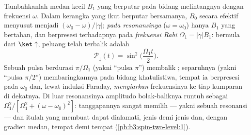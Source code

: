 \begin{proposition}\label{prop:b3:spin-two-level:rabi}
Tambahkanlah medan kecil $B_1$ yang berputar pada bidang melintangnya
dengan frekuensi $\omega$. Dalam kerangka yang ikut berputar
bersamanya, $B_0$ secara efektif menyusut menjadi
$(\omega_0 - \omega)/|\gamma|$; \emph{pada resonansinya}
($\omega = \omega_0$) hanya $B_1$ yang bertahan, dan  berpresesi
terhadapnya pada \emph{frekuensi Rabi} $\Omega_1 =
|\gamma|B_1$: bermula dari $\ket\uparrow$, peluang telah terbalik adalah
\[
\mathcal P_\downarrow(t) = \sin^2\Big(\frac{\Omega_1t}{2}\Big) .
\]
Sebuah pulsa berdurasi $\pi/\Omega_1$ (yakni ``pulsa $\pi$'') membalik
; separuhnya (yakni ``pulsa $\pi/2$'') membaringkannya pada
bidang khatulistiwa, tempat ia berpresesi pada $\omega_0$ dan, lewat
induksi Faraday, \emph{menyiarkan} frekuensinya ke tiap kumparan di
dekatnya. Di luar resonansinya amplitudo bolak-baliknya runtuh sebagai
$\Omega_1^2/[\Omega_1^2 +
(\omega - \omega_0)^2]$: tanggapannya sangat memilih --- yakni sebuah
resonansi --- dan itulah yang membuat  dapat dialamati, jenis demi
jenis dan, dengan gradien medan, tempat demi tempat
(\cref{pb:b3:spin-two-level:1}).
\end{proposition}
\admitted

